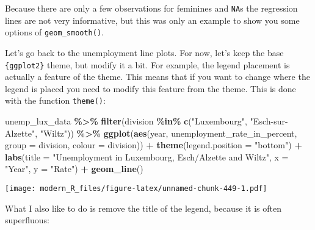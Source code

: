 \documentclass[
]{article}
\newenvironment{Shaded}{\begin{snugshade}}{\end{snugshade}}
\newcommand{\DataTypeTok}[1]{\textcolor[rgb]{0.13,0.29,0.53}{#1}}
\newcommand{\KeywordTok}[1]{\textcolor[rgb]{0.13,0.29,0.53}{\textbf{#1}}}
\newcommand{\NormalTok}[1]{#1}
\newcommand{\OperatorTok}[1]{\textcolor[rgb]{0.81,0.36,0.00}{\textbf{#1}}}
\newcommand{\StringTok}[1]{\textcolor[rgb]{0.31,0.60,0.02}{#1}}
\begin{document}
Because there are only a few observations for feminines and \texttt{NA}s the regression lines are not very informative,
but this was only an example to show you some options of \texttt{geom\_smooth()}.

Let's go back to the unemployment line plots. For now, let's keep the base \texttt{\{ggplot2\}} theme, but
modify it a bit. For example, the legend placement is actually a feature of the theme. This means
that if you want to change where the legend is placed you need to modify this feature from the
theme. This is done with the function \texttt{theme()}:

\begin{Shaded}
\begin{Highlighting}[]
\NormalTok{unemp\_lux\_data }\OperatorTok{\%\textgreater{}\%}
\StringTok{  }\KeywordTok{filter}\NormalTok{(division }\OperatorTok{\%in\%}\StringTok{ }\KeywordTok{c}\NormalTok{(}\StringTok{"Luxembourg"}\NormalTok{, }\StringTok{"Esch{-}sur{-}Alzette"}\NormalTok{, }\StringTok{"Wiltz"}\NormalTok{)) }\OperatorTok{\%\textgreater{}\%}
\StringTok{  }\KeywordTok{ggplot}\NormalTok{(}\KeywordTok{aes}\NormalTok{(year, unemployment\_rate\_in\_percent, }\DataTypeTok{group =}\NormalTok{ division, }\DataTypeTok{colour =}\NormalTok{ division)) }\OperatorTok{+}
\StringTok{  }\KeywordTok{theme}\NormalTok{(}\DataTypeTok{legend.position =} \StringTok{"bottom"}\NormalTok{) }\OperatorTok{+}
\StringTok{  }\KeywordTok{labs}\NormalTok{(}\DataTypeTok{title =} \StringTok{"Unemployment in Luxembourg, Esch/Alzette and Wiltz"}\NormalTok{, }\DataTypeTok{x =} \StringTok{"Year"}\NormalTok{, }\DataTypeTok{y =} \StringTok{"Rate"}\NormalTok{) }\OperatorTok{+}
\StringTok{  }\KeywordTok{geom\_line}\NormalTok{()}
\end{Highlighting}
\end{Shaded}

\texttt{[image: modern\_R\_files/figure-latex/unnamed-chunk-449-1.pdf]}

What I also like to do is remove the title of the legend, because it is often superfluous:
\end{document}
